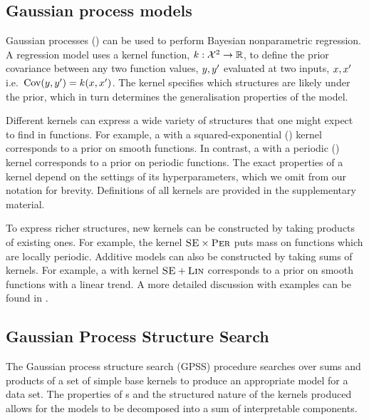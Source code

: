 \documentclass{article}
\def\ie{i.e.\ }
\begin{document}
\subsection{Gaussian process models}

Gaussian processes (\gp{}) \citep{rasmussen38gaussian} can be used to perform Bayesian nonparametric regression.
A \gp{} regression model uses a kernel function, ${k : \mathcal{X}^2 \to \mathbb{R}}$, to define the prior covariance between any two function values, $y, y'$ evaluated at two inputs, $x,x'$ \ie ${\textrm{Cov}(y, y') = k(x,x')}$.
The kernel specifies which structures are likely under the \gp{} prior, which in turn determines the generalisation properties of the model.

Different kernels can express a wide variety of structures that one might expect to find in functions.
For example, a \gp{} with a squared-exponential (\kSE) kernel corresponds to a prior on smooth functions.
In contrast, a \gp{} with a periodic (\kPer) kernel corresponds to a prior on periodic functions.  The exact properties of a kernel depend on the settings of its hyperparameters, which we omit from our notation for brevity.
Definitions of all kernels are provided in the supplementary material.

To express richer structures, new kernels can be constructed by taking products of existing ones.
For example, the kernel ${\textsc{SE}} \times {\textsc{Per}}$ puts mass on functions which are locally periodic.
Additive models can also be constructed by taking sums of kernels.
For example, a \gp{} with kernel ${\textsc{SE}} + {\textsc{Lin}}$ corresponds to a prior on smooth functions with a linear trend.
A more detailed discussion with examples can be found in \cite{DuvLloGroetal13}.

\subsection{Gaussian Process Structure Search}

The Gaussian process structure search (GPSS) procedure \citep{DuvLloGroetal13} searches over sums and products of a set of simple base kernels to produce an appropriate model for a data set.
The properties of \gp{}s and the structured nature of the kernels produced allows for the models to be decomposed into a sum of interpretable components.
\end{document}
